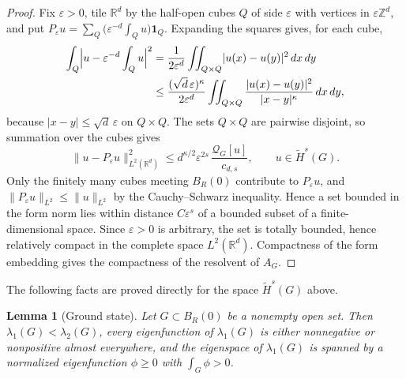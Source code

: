 \documentclass[twoside,10pt]{article}
\numberwithin{equation}{section}
\theoremstyle{slbody}
\newtheorem{lemma}[theorem]{Lemma}
\theoremstyle{definition}
\newcommand{\R}{\mathbb{R}}
\newcommand{\Hs}{\widetilde H^s}
\newcommand{\norm}[1]{\lVert #1\rVert}
\newcommand{\abs}[1]{\lvert #1\rvert}
\begin{document}
\begin{proof}
Fix $\varepsilon>0$, tile $\R^d$ by the half-open cubes $Q$ of side
$\varepsilon$ with vertices in $\varepsilon\mathbb Z^d$, and put
$P_\varepsilon u=\sum_Q\bigl(\varepsilon^{-d}\int_Qu\bigr)\mathbf 1_Q$.
Expanding the squares gives, for each cube,
\begin{align*}
 \int_Q\Bigl|u-\varepsilon^{-d}\int_Qu\Bigr|^2
 &=\frac1{2\varepsilon^d}\iint_{Q\times Q}\abs{u(x)-u(y)}^2\,dx\,dy\\
 &\leq\frac{(\sqrt d\,\varepsilon)^{\kappa}}{2\varepsilon^d}
 \iint_{Q\times Q}\frac{\abs{u(x)-u(y)}^2}{\abs{x-y}^{\kappa}}\,dx\,dy,
\end{align*}
because $\abs{x-y}\leq\sqrt d\,\varepsilon$ on $Q\times Q$.  The sets
$Q\times Q$ are pairwise disjoint, so summation over the cubes gives
\[
 \norm{u-P_\varepsilon u}_{L^2(\R^d)}^2
 \leq d^{\kappa/2}\varepsilon^{2s}\,\frac{\mathcal{Q}_G[u]}{c_{d,s}},
 \qquad u\in\Hs(G).
\]
Only the finitely many cubes meeting $B_R(0)$ contribute to
$P_\varepsilon u$, and $\norm{P_\varepsilon u}_{L^2}\leq\norm{u}_{L^2}$ by the
Cauchy--Schwarz inequality.  Hence a set bounded in the form norm lies within
distance $C\varepsilon^s$ of a bounded subset of a finite-dimensional space.
Since $\varepsilon>0$ is arbitrary, the set is totally bounded, hence
relatively compact in the complete space $L^2(\R^d)$.  Compactness of the form
embedding gives the compactness of the resolvent of $A_G$.
\end{proof}

The following facts are proved directly for the space $\Hs(G)$ above.

\begin{lemma}[Ground state]\label{lem:ground}
Let $G\subset B_R(0)$ be a nonempty open set.  Then
$\lambda_1(G)<\lambda_2(G)$, every eigenfunction of $\lambda_1(G)$ is either
nonnegative or nonpositive almost everywhere, and the eigenspace of
$\lambda_1(G)$ is spanned by a normalized eigenfunction $\phi\geq0$ with
$\int_G\phi>0$.
\end{lemma}
\end{document}
